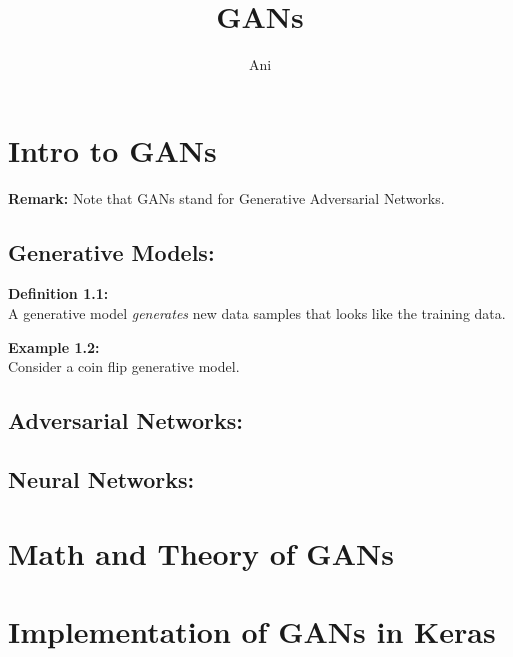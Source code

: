 \documentclass[a4paper]{article}
\title{GANs}
\author{Ani}
\begin{document}
	
	\maketitle
	
	\section{Intro to GANs}
	
	\textbf{Remark:} Note that GANs stand for Generative Adversarial Networks.
	
	\subsection{Generative Models:}
	
	\begin{tcolorbox}
		\textbf{Definition 1.1:} \\
		
		A generative model \emph{generates} new data samples that looks like the training data.
	\end{tcolorbox}
	
	\begin{tcolorbox}
		\textbf{Example 1.2:} \\
		
		Consider a coin flip generative model. \\
		
	\end{tcolorbox}
	
	\subsection{Adversarial Networks:}
	
	\subsection{Neural Networks:}
	
	\section{Math and Theory of GANs}
	
	\section{Implementation of GANs in Keras}
	
\end{document}
